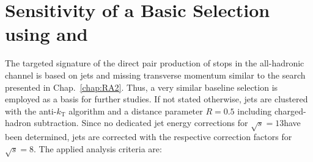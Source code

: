 \section{Sensitivity of a Basic Selection using \HT and \met}
\label{sec:stop_baseline}
The targeted signature of the direct pair production of stops in the all-hadronic channel is based on jets and missing transverse momentum similar to the search presented in Chap.~\ref{chap:RA2}. Thus, a very similar baseline selection is employed as a basis for further studies. If not stated otherwise, jets are clustered with the anti-$k_\mathrm{T}$ algorithm and a distance parameter $R = 0.5$ including charged-hadron subtraction. Since no dedicated jet energy corrections for $\sqrt{s} = 13$\tev have been determined, jets are corrected with the respective correction factors for $\sqrt{s} = 8$\tev. The applied analysis criteria are:
